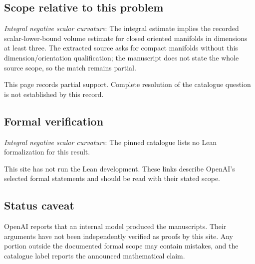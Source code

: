 \documentclass[11pt]{article}
\begin{document}
\subsection{Scope relative to this problem}
\textit{Integral negative scalar curvature}: The integral estimate implies the recorded scalar-lower-bound volume estimate for closed oriented manifolds in dimensions at least three. The extracted source asks for compact manifolds without this dimension/orientation qualification; the manuscript does not state the whole source scope, so the match remains partial.

This page records partial support. Complete resolution of the catalogue question is not established by this record.

\subsection{Formal verification}
\textit{Integral negative scalar curvature}: The pinned catalogue lists no Lean formalization for this result.

This site has not run the Lean development. These links describe OpenAI’s selected formal statements and should be read with their stated scope.

\subsection{Status caveat}
OpenAI reports that an internal model produced the manuscripts. Their arguments have not been independently verified as proofs by this site. Any portion outside the documented formal scope may contain mistakes, and the catalogue label reports the announced mathematical claim.
\end{document}
